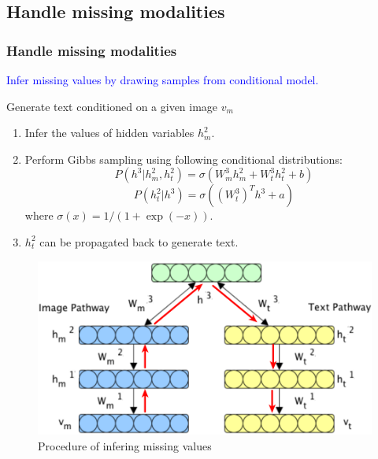 \documentclass{beamer}
\begin{document}
\begin{CJK*}{UTF8}{gbsn}
\subsection{Handle missing modalities}
\begin{frame}[allowframebreaks]\frametitle{Handle missing modalities}
\textcolor{blue}{Infer missing values by drawing samples from conditional model.}\\
\begin{block}{Generate text conditioned on a given image $v_m$}
\begin{enumerate}
\item Infer the values of hidden variables $h_m^2$.
\item Perform Gibbs sampling using following conditional distributions:
\begin{equation}
P(h^3|h_m^2,h_t^2)=\sigma(W_m^3h_m^2+W_t^3h_t^2+b)
\end{equation}
\begin{equation}
P(h_t^2|h^3)=\sigma((W_t^3)^Th^3+a)
\end{equation}
where $\sigma(x)=1/(1+\exp(-x))$.
\item $h_t^2$ can be propagated back to generate text.
\end{enumerate}
\end{block}
\centering
\begin{figure}
\caption[t]{Procedure of infering missing values}
\includegraphics[scale=0.3]{images/infermissingmodality}
\end{figure}

\end{frame}



\end{CJK*}
\end{document}
